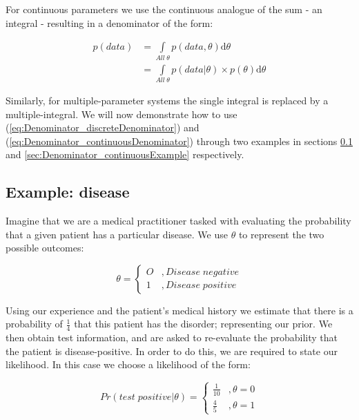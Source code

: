 \documentclass[11pt,fullpage]{book}
\begin{document}
For continuous parameters we use the continuous analogue of the sum - an integral - resulting in a denominator of the form:

\begin{equation}\label{eq:Denominator_continuousDenominator}
\begin{align}
p(data) &= \int\limits_{All\;\theta} p(data,\theta) \mathrm{d}\theta\\
&= \int\limits_{All\;\theta} p(data|\theta) \times p(\theta) \mathrm{d}\theta
\end{align}
\end{equation}

Similarly, for multiple-parameter systems the single integral is replaced by a multiple-integral. We will now demonstrate how to use (\ref{eq:Denominator_discreteDenominator}) and (\ref{eq:Denominator_continuousDenominator}) through two examples in sections \ref{sec:Denominator_discreteExample} and \ref{sec:Denominator_continuousExample} respectively.

\subsection{Example: disease}\label{sec:Denominator_discreteExample}
Imagine that we are a medical practitioner tasked with evaluating the probability that a given patient has a particular disease. We use $\theta$ to represent the two possible outcomes: 

\begin{equation}
\theta =
\begin{cases}
O & , Disease \; negative \\
1 & ,  Disease \; positive
\end{cases}
\end{equation}

Using our experience and the patient's medical history we estimate that there is a probability of $\frac{1}{4}$ that this patient has the disorder; representing our prior. We then obtain test information, and are asked to re-evaluate the probability that the patient is disease-positive. In order to do this, we are required to state our likelihood. In this case we choose a likelihood of the form:

\begin{equation}\label{eq:Denominator_discreteLikelihood}
Pr(test\;positive|\theta) =
\begin{cases}
\frac{1}{10} & , \theta=0\\
\frac{4}{5} & ,  \theta=1
\end{cases}
\end{equation}
\end{document}
